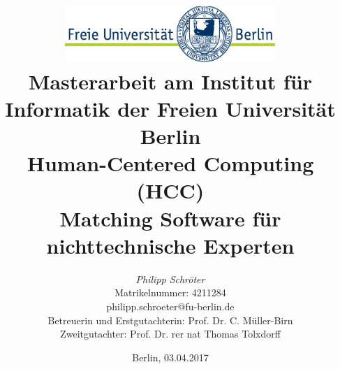 %
\begin{titlepage}

\title{\includegraphics[width=0.6\textwidth]{pics/FU_logo.pdf}\\
{\small Masterarbeit am Institut für Informatik der Freien Universität Berlin}\\
{\small Human-Centered Computing (HCC)}\\
{\LARGEOntologie Matching Software für nichttechnische Experten}}

\author{
{\emph{\normalsize Philipp Schröter}}\\
{\normalsize Matrikelnummer: 4211284}\\
{\normalsize philipp.schroeter@fu-berlin.de}\\
[18ex]
{\normalsize Betreuerin und Erstgutachterin: Prof. Dr. C. Müller-Birn} \\
{\normalsize Zweitgutachter: Prof. Dr. rer nat Thomas Tolxdorff}
}
\vspace{6ex}
\date{\normalsize Berlin, 03.04.2017}

\maketitle
\end{titlepage}
